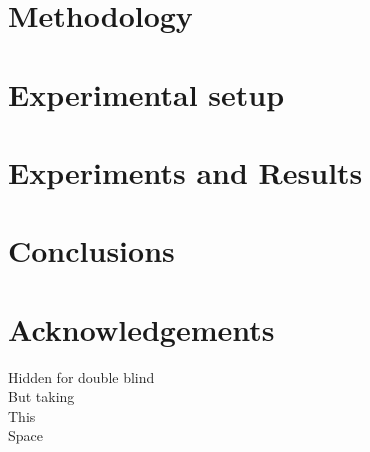 \documentclass[runningheads,a4paper]{llncs}
\begin{document}
\section{Methodology} %
\label{sec:met}


\section{Experimental setup}
\label{sec:exp}



\section{Experiments and Results}
\label{sec:res}





\section{Conclusions}

\section*{Acknowledgements}

Hidden for double blind\\
But taking\\
This\\
Space




\end{document}

